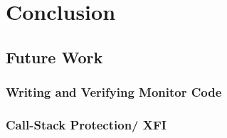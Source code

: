 
\chapter{Conclusion}

\section{Future Work}


\subsection{Writing and Verifying Monitor Code}

\subsection{Call-Stack Protection/ XFI}
